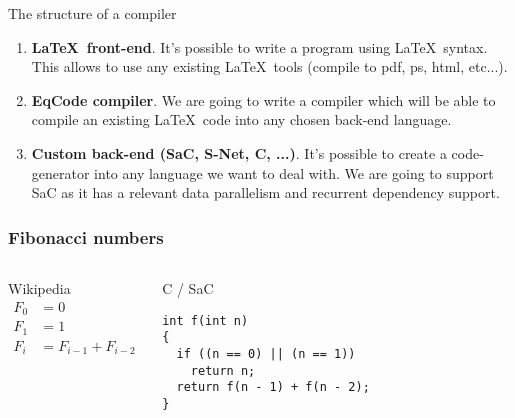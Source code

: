 \documentclass[xcolor=dvipsnames,mathserif,professionalfont,12pt]{beamer}
\begin{document}
\begin{frame}{The structure of a compiler}
  \begin{enumerate}
    \item \textbf{\LaTeX\  front-end}. It's possible to write a program using
    \LaTeX\  syntax. This allows to use any existing \LaTeX\  tools (compile to
    pdf, ps, html, etc...). \\
    \item \textbf{EqCode compiler}. We are going to write a compiler which will
    be able to compile an existing \LaTeX\  code into any chosen back-end
    language.
    \item \textbf{Custom back-end (SaC, S-Net, C, ...)}. It's possible to
    create a code-generator into any language we want to deal with. We are
    going to support SaC as it has a relevant data parallelism and recurrent
    dependency support.
  \end{enumerate}
\end{frame}

\begin{frame}[fragile]
  \frametitle{Fibonacci numbers}
  \begin{columns}[t]
      \begin{block}{Wikipedia}
        \begin{align*}
F_0 &= 0  \\
F_1 &= 1  \\ 
F_i &= F_{i-1} + F_{i-2}
        \end{align*}
      \end{block}
      \begin{block}{C / SaC}
        \begin{lstlisting}
int f(int n)
{
  if ((n == 0) || (n == 1))
    return n;
  return f(n - 1) + f(n - 2);
}
        \end{lstlisting}
    \end{block}
  \end{columns}
\end{frame}

 
\end{document}
